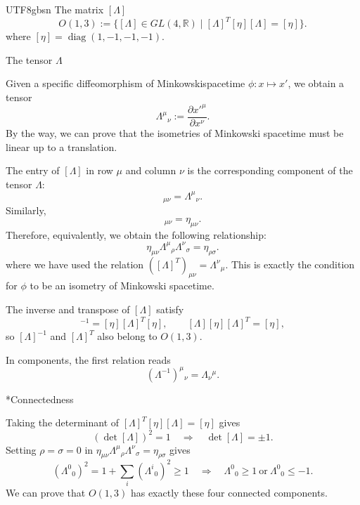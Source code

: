 \documentclass[11pt,a4paper,oneside]{report}
\makeatletter
\newcommand\topic{\@startsection{paragraph}{4}{\z@}{-1.7ex plus -.3ex}{.5ex}{\normalfont\normalsize\bfseries\itshape\boldmath}*}
\makeatother
\begin{document}
\begin{CJK*}{UTF8}{gbsn}
The matrix $[\Lambda]$
\begin{equation*}
O(1,3):=\{[\Lambda]\in GL(4,\mathbb R)\mid [\Lambda]^T[\eta][\Lambda]=[\eta]\}.
\tag{B.16}\label{eq:B.16}
\end{equation*}
where $[\eta]=\operatorname{diag}(1,-1,-1,-1)$.

The tensor $\Lambda$

Given a specific diffeomorphism of Minkowskispacetime $\phi:x\mapsto x'$, we obtain a tensor
\begin{equation*}
\Lambda^\mu{}_\nu:=\frac{\partial x'^\mu}{\partial x^\nu}.
\tag{B.17}\label{eq:B.17}
\end{equation*}
By the way, we can prove that the isometries of Minkowski spacetime must be linear up to a translation.

The entry of $[\Lambda]$ in row $\mu$ and column $\nu$ is the corresponding component of the tensor $\Lambda$:
\begin{equation*}
[\Lambda]_{\mu\nu}=\Lambda^\mu{}_\nu.
\tag{B.18}\label{eq:B.18}
\end{equation*}
Similarly,
\begin{equation*}
[\eta]_{\mu\nu}=\eta_{\mu\nu}.
\tag{B.19}\label{eq:B.19}
\end{equation*}
Therefore, equivalently, we obtain the following relationship:
\begin{equation*}
\eta_{\mu\nu}\Lambda^\mu{}_\rho\Lambda^\nu{}_\sigma=\eta_{\rho\sigma}.
\tag{B.20}\label{eq:B.20}
\end{equation*}
where we have used the relation $([\Lambda]^T)_{\mu\nu}=\Lambda^\nu{}_\mu$. This is exactly the condition for $\phi$ to be an isometry of Minkowski spacetime.

The inverse and transpose of $[\Lambda]$ satisfy
\begin{equation*}
[\Lambda]^{-1}=[\eta][\Lambda]^T[\eta],\qquad
[\Lambda][\eta][\Lambda]^T=[\eta],
\tag{B.21}\label{eq:B.21}
\end{equation*}
so $[\Lambda]^{-1}$ and $[\Lambda]^T$ also belong to $O(1,3)$.

In components, the first relation reads
\begin{equation*}
(\Lambda^{-1})^\mu{}_\nu=\Lambda_\nu{}^\mu.
\tag{B.22}\label{eq:B.22}
\end{equation*}

\topic{Connectedness}

Taking the determinant of $[\Lambda]^T[\eta][\Lambda]=[\eta]$ gives
\begin{equation*}
(\det[\Lambda])^2=1\quad\Longrightarrow\quad\det[\Lambda]=\pm1.
\tag{B.23}\label{eq:B.23}
\end{equation*}
Setting $\rho=\sigma=0$ in $\eta_{\mu\nu}\Lambda^\mu{}_\rho\Lambda^\nu{}_\sigma=\eta_{\rho\sigma}$ gives
\begin{equation*}
(\Lambda^0{}_0)^2=1+\sum_i(\Lambda^i{}_0)^2\ge1\quad\Longrightarrow\quad\Lambda^0{}_0\ge1\ \text{or}\ \Lambda^0{}_0\le-1.
\tag{B.24}\label{eq:B.24}
\end{equation*}
We can prove that $O(1,3)$ has exactly these four connected components.


\end{CJK*}
\end{document}
